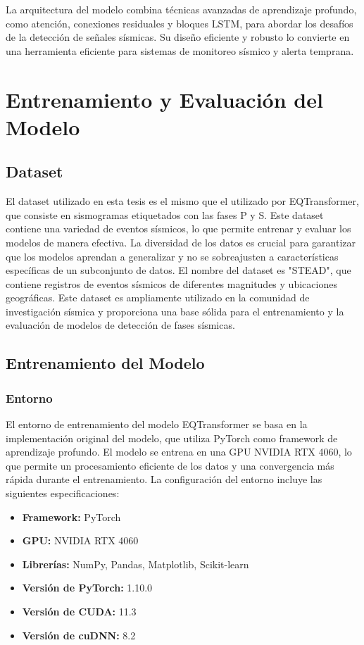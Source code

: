 La arquitectura del modelo combina técnicas avanzadas de aprendizaje profundo, como atención, conexiones residuales y bloques LSTM, para abordar los desafíos de la detección de señales sísmicas. Su diseño eficiente y robusto lo convierte en una herramienta eficiente para sistemas de monitoreo sísmico y alerta temprana.

\section{Entrenamiento y Evaluación del Modelo}


\subsection{Dataset}
El dataset utilizado en esta tesis es el mismo que el utilizado por EQTransformer, que consiste en sismogramas etiquetados con las fases P y S. Este dataset contiene una variedad de eventos sísmicos, lo que permite entrenar y evaluar los modelos de manera efectiva. La diversidad de los datos es crucial para garantizar que los modelos aprendan a generalizar y no se sobreajusten a características específicas de un subconjunto de datos. El nombre del dataset es "STEAD", que contiene registros de eventos sísmicos de diferentes magnitudes y ubicaciones geográficas. Este dataset es ampliamente utilizado en la comunidad de investigación sísmica y proporciona una base sólida para el entrenamiento y la evaluación de modelos de detección de fases sísmicas.

\subsection{Entrenamiento del Modelo}

\subsubsection{Entorno}

El entorno de entrenamiento del modelo EQTransformer se basa en la implementación original del modelo, que utiliza PyTorch como framework de aprendizaje profundo. El modelo se entrena en una GPU NVIDIA RTX 4060, lo que permite un procesamiento eficiente de los datos y una convergencia más rápida durante el entrenamiento. La configuración del entorno incluye las siguientes especificaciones:

\begin{itemize}
    \item \textbf{Framework:} PyTorch
    \item \textbf{GPU:} NVIDIA RTX 4060
    \item \textbf{Librerías:} NumPy, Pandas, Matplotlib, Scikit-learn
    \item \textbf{Versión de PyTorch:} 1.10.0
    \item \textbf{Versión de CUDA:} 11.3
    \item \textbf{Versión de cuDNN:} 8.2
\end{itemize}


